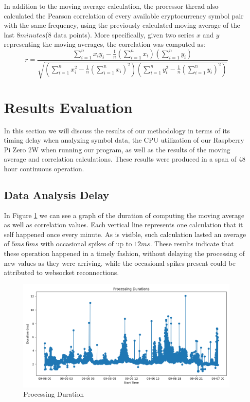\documentclass[12pt]{article}
\begin{document}
        In addition to the moving average calculation, the processor thread also calculated the Pearson correlation of every available 
        cryptocurrency symbol pair with the same frequency, using the previously calculated moving average of the last $8 minutes$(8 data points). 
        More specifically, given two series $x$ and $y$ representing the moving averages, the correlation was computed as:
        \[
            r =
            \frac{
                \sum_{i=1}^{n} x_i y_i - \tfrac{1}{n}\left(\sum_{i=1}^{n} x_i\right)\left(\sum_{i=1}^{n} y_i\right)
            }{
                \sqrt{
                    \left(\sum_{i=1}^{n} x_i^2 - \tfrac{1}{n}\left(\sum_{i=1}^{n} x_i\right)^2\right)
                    \left(\sum_{i=1}^{n} y_i^2 - \tfrac{1}{n}\left(\sum_{i=1}^{n} y_i\right)^2\right)
                }
            }
        \]

\section{Results Evaluation}
    In this section we will discuss the results of our methodology in terms of its timing delay when analyzing symbol data, 
    the CPU utilization of our Raspberry Pi Zero 2W when running our program, as well as the results of the moving average and 
    correlation calculations. These results were produced in a span of 48 hour continuous operation.

    \subsection{Data Analysis Delay}
        In Figure \ref{fig:proc_duration} we can see a graph of the duration of computing the moving average as well as correlation values. 
        Each vertical line represents one calculation that it self happened once every minute. As is visible, such calculation lasted an 
        average of $5ms~6ms$ with occasional spikes of up to $12ms$. These results indicate that these operation happened in a timely fashion, 
        without delaying the processing of new values as they were arriving, while the occasional spikes present could be attributed to websocket 
        reconnections.
        
        \begin{figure}[!h]
            \centering
            \includegraphics[width=0.8\linewidth]{../results/timings_durations.png}
            \caption{Processing Duration}
            \label{fig:proc_duration}
        \end{figure}
        
\end{document}
